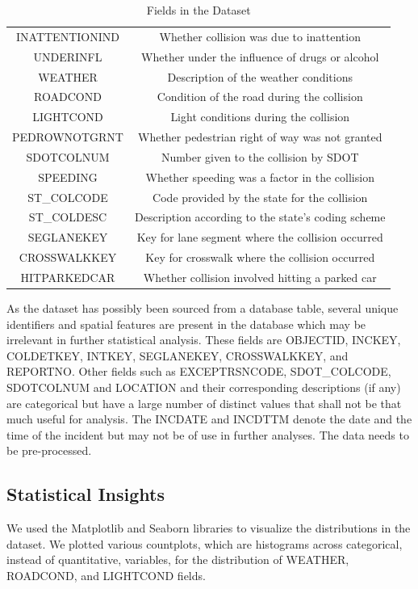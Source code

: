 \documentclass{article}
\begin{document}
\begin{table}
\begin{tabular}{|c | c|}
  INATTENTIONIND & Whether collision was due to inattention\\
  UNDERINFL & Whether under the influence of drugs or alcohol\\
  WEATHER & Description of the weather conditions\\
  ROADCOND & Condition of the road during the collision\\
  LIGHTCOND & Light conditions during the collision\\
  PEDROWNOTGRNT & Whether pedestrian right of way was not granted\\
  SDOTCOLNUM & Number given to the collision by SDOT\\
  SPEEDING & Whether speeding was a factor in the collision\\
  ST\_COLCODE & Code provided by the state for the collision\\
  ST\_COLDESC & Description according to the state’s coding scheme\\
  SEGLANEKEY & Key for lane segment where the collision occurred\\
  CROSSWALKKEY & Key for crosswalk where the collision occurred\\
  HITPARKEDCAR & Whether collision involved hitting a parked car\\
  \hline
  \end{tabular}
  \caption{Fields in the Dataset}\label{fields}
\end{table}

As the dataset has possibly been sourced from a database table, several unique identifiers and spatial features are present in the database which may be irrelevant in further statistical analysis. These fields are OBJECTID, INCKEY, COLDETKEY, INTKEY, SEGLANEKEY, CROSSWALKKEY, and REPORTNO. Other fields such as EXCEPTRSNCODE, SDOT\_COLCODE, SDOTCOLNUM and LOCATION and their corresponding descriptions (if any) are categorical but have a large number of distinct values that shall not be that much useful for analysis. The INCDATE and INCDTTM denote the date and the time of the incident but may not be of use in further analyses. The data needs to be pre-processed.

\subsection{Statistical Insights}

We used the Matplotlib and Seaborn libraries to visualize the distributions in the dataset. We plotted various countplots, which are histograms across categorical, instead of quantitative, variables, for the distribution of WEATHER, ROADCOND, and LIGHTCOND fields.
\end{document}
